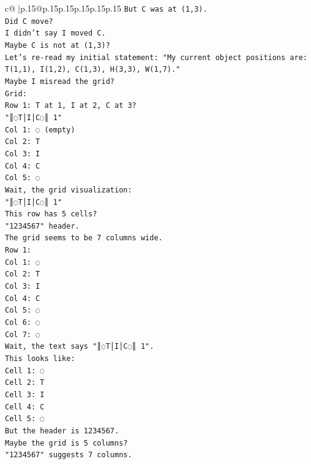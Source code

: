 \documentclass{article}
\begin{document}
{\begin{supertabular}{c@{$\;$}|p{.15\linewidth}@{}p{.15\linewidth}p{.15\linewidth}p{.15\linewidth}p{.15\linewidth}p{.15\linewidth}}
{{{\texttt{But C was at (1,3).} \\
\texttt{Did C move?} \\
\texttt{I didn't say I moved C.} \\
\texttt{Maybe C is not at (1,3)?} \\
\texttt{Let's re{-}read my initial statement: "My current object positions are: T(1,1), I(1,2), C(1,3), H(3,3), W(1,7)."} \\
\texttt{Maybe I misread the grid?} \\
\texttt{Grid:} \\
\texttt{Row 1: T at 1, I at 2, C at 3?} \\
\texttt{"║◌T│I│C◌║ 1"} \\
\texttt{Col 1: ◌ (empty)} \\
\texttt{Col 2: T} \\
\texttt{Col 3: I} \\
\texttt{Col 4: C} \\
\texttt{Col 5: ◌} \\
\texttt{Wait, the grid visualization:} \\
\texttt{"║◌T│I│C◌║ 1"} \\
\texttt{This row has 5 cells?} \\
\texttt{"1234567" header.} \\
\texttt{The grid seems to be 7 columns wide.} \\
\texttt{Row 1:} \\
\texttt{Col 1: ◌} \\
\texttt{Col 2: T} \\
\texttt{Col 3: I} \\
\texttt{Col 4: C} \\
\texttt{Col 5: ◌} \\
\texttt{Col 6: ◌} \\
\texttt{Col 7: ◌} \\
\texttt{Wait, the text says "║◌T│I│C◌║ 1".} \\
\texttt{This looks like:} \\
\texttt{Cell 1: ◌} \\
\texttt{Cell 2: T} \\
\texttt{Cell 3: I} \\
\texttt{Cell 4: C} \\
\texttt{Cell 5: ◌} \\
\texttt{But the header is 1234567.} \\
\texttt{Maybe the grid is 5 columns?} \\
\texttt{"1234567" suggests 7 columns.} \\
}}}
\end{supertabular}}
\end{document}
